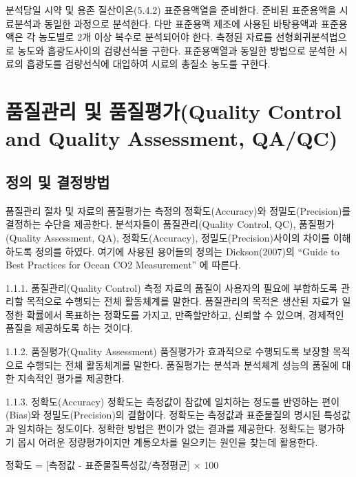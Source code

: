 \documentclass[
]{book}
\begin{document}
분석당일 시약 및 용존 질산이온(5.4.2) 표준용액열을 준비한다. 준비된 표준용액을 시료분석과 동일한 과정으로 분석한다. 다만 표준용액 제조에 사용된 바탕용액과 표준용액은 각 농도별로 2개 이상 복수로 분석되어야 한다. 측정된 자료를 선형회귀분석법으로 농도와 흡광도사이의 검량선식을 구한다. 표준용액열과 동일한 방법으로 분석한 시료의 흡광도를 검량선식에 대입하여 시료의 총질소 농도를 구한다.

\hypertarget{uxd488uxc9c8uxad00uxb9ac-uxbc0f-uxd488uxc9c8uxd3c9uxac00quality-control-and-quality-assessment-qaqc-1}{%
\section{품질관리 및 품질평가(Quality Control and Quality Assessment, QA/QC)}\label{uxd488uxc9c8uxad00uxb9ac-uxbc0f-uxd488uxc9c8uxd3c9uxac00quality-control-and-quality-assessment-qaqc-1}}

\hypertarget{uxc815uxc758-uxbc0f-uxacb0uxc815uxbc29uxbc95-1}{%
\subsection{정의 및 결정방법}\label{uxc815uxc758-uxbc0f-uxacb0uxc815uxbc29uxbc95-1}}

품질관리 절차 및 자료의 품질평가는 측정의 정확도(Accuracy)와 정밀도(Precision)를 결정하는 수단을 제공한다. 분석자들이 품질관리(Quality Control, QC), 품질평가(Quality Assessment, QA), 정확도(Accuracy), 정밀도(Precision)사이의 차이를 이해하도록 정의를 하였다. 여기에 사용된 용어들의 정의는 Dickson(2007)의 ``Guide to Best Practices for Ocean CO2 Measurement'' 에 따른다.

1.1.1. 품질관리(Quality Control)
측정 자료의 품질이 사용자의 필요에 부합하도록 관리할 목적으로 수행되는 전체 활동체계를 말한다. 품질관리의 목적은 생산된 자료가 일정한 확률에서 목표하는 정확도를 가지고, 만족할만하고, 신뢰할 수 있으며, 경제적인 품질을 제공하도록 하는 것이다.

1.1.2. 품질평가(Quality Assessment)
품질평가가 효과적으로 수행되도록 보장할 목적으로 수행되는 전체 활동체계를 말한다. 품질평가는 분석과 분석체계 성능의 품질에 대한 지속적인 평가를 제공한다.

1.1.3. 정확도(Accuracy)
정확도는 측정값이 참값에 일치하는 정도를 반영하는 편이(Bias)와 정밀도(Precision)의 결합이다. 정확도는 측정값과 표준물질의 명시된 특성값과 일치하는 정도이다. 정확한 방법은 편이가 없는 결과를 제공한다. 정확도는 평가하기 몹시 어려운 정량평가이지만 계통오차를 일으키는 원인을 찾는데 활용한다.

정확도 = {[}측정값 - 표준물질특성값/측정평균{]} × 100
\end{document}
